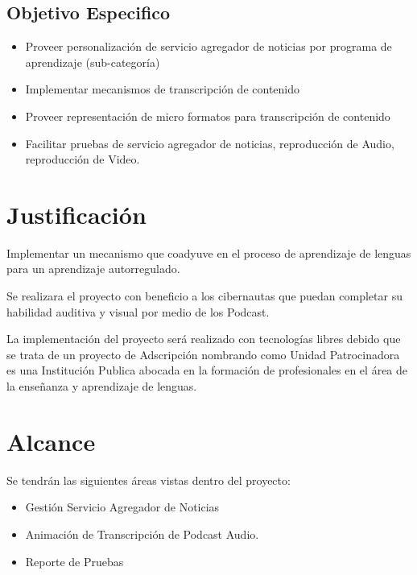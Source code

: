 \subsection{Objetivo Especifico}

\begin{itemize}

\item Proveer personalización de servicio agregador de noticias por programa de
aprendizaje (sub-categoría)

\item Implementar mecanismos de transcripción de contenido

\item Proveer representación de micro formatos para transcripción de contenido

\item Facilitar pruebas de servicio agregador de noticias, reproducción de Audio,
reproducción de Video.

\end{itemize}

\section{Justificación}
Implementar un mecanismo que coadyuve en el proceso de aprendizaje de lenguas
para un aprendizaje autorregulado.

Se realizara el proyecto con beneficio a los cibernautas que puedan completar su
habilidad auditiva y visual por medio de los Podcast.

La implementación del proyecto será realizado con tecnologías libres debido que se
trata de un proyecto de Adscripción nombrando como Unidad Patrocinadora es una
Institución Publica abocada en la formación de profesionales en el área de la
enseñanza y aprendizaje de lenguas.

\section{Alcance}

Se tendrán las siguientes áreas vistas dentro del proyecto:

\begin{itemize}

\item Gestión Servicio Agregador de Noticias
\item Animación de Transcripción de Podcast Audio.
\item Reporte de Pruebas

\end{itemize}